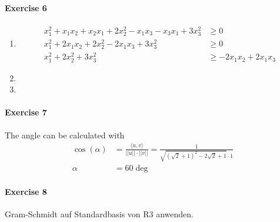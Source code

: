 \documentclass{article}
\begin{document}
\paragraph{Exercise 6}

\begin{enumerate}[label=(\roman*)]
    \item \begin{align*}
        x_1^2 + x_1x_2 + x_2x_1 + 2x_2^2 - x_1x_3 - x_3x_1 + 3x_3^2 &\geq 0 \\
        x_1^2 + 2x_1x_2 + 2x_2^2 - 2x_1x_3 + 3x_3^2 &\geq 0 \\
        x_1^2 + 2x_2^2 + 3x_3^2 &\geq -2x_1x_2 + 2x_1x_3 
    \end{align*}

    \item \phantom{i}


    \item \phantom{i}

\end{enumerate}

\paragraph{Exercise 7}

The angle can be calculated with
\begin{align*}
    \cos(\alpha) &= \frac{\langle u, v \rangle}{||u|| \cdot ||v||} = \frac{1}{\sqrt{\left(\sqrt{2}+1\right)^2-2 \sqrt{2}+1} \cdot 1} \\
    \alpha &= 60\deg
\end{align*}

\paragraph{Exercise 8}


Gram-Schmidt auf Standardbasis von R3 anwenden. 
\end{document}

